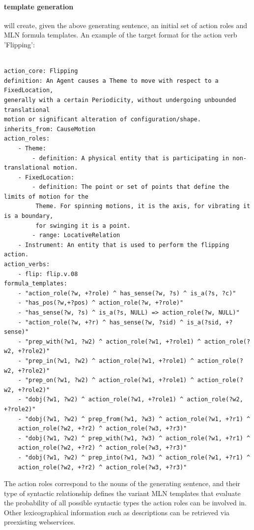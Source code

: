 \documentclass[oribibl]{llncs}
\begin{document}
\paragraph{template generation} will create, given the above generating sentence, an initial set of action roles and MLN formula templates.
An example of the target format for the action verb 'Flipping': 
  
{\scriptsize

\begin{verbatim}
  
action_core: Flipping
definition: An Agent causes a Theme to move with respect to a FixedLocation, 
generally with a certain Periodicity, without undergoing unbounded translational 
motion or significant alteration of configuration/shape.
inherits_from: CauseMotion
action_roles:
    - Theme:
        - definition: A physical entity that is participating in non-translational motion.
    - FixedLocation:
        - definition: The point or set of points that define the limits of motion for the
         Theme. For spinning motions, it is the axis, for vibrating it is a boundary, 
         for swinging it is a point. 
        - range: LocativeRelation
    - Instrument: An entity that is used to perform the flipping action.
action_verbs:
    - flip: flip.v.08
formula_templates:
    - "action_role(?w, +?role) ^ has_sense(?w, ?s) ^ is_a(?s, ?c)"
    - "has_pos(?w,+?pos) ^ action_role(?w, +?role)"
    - "has_sense(?w, ?s) ^ is_a(?s, NULL) => action_role(?w, NULL)"
    - "action_role(?w, +?r) ^ has_sense(?w, ?sid) ^ is_a(?sid, +?sense)"
    - "prep_with(?w1, ?w2) ^ action_role(?w1, +?role1) ^ action_role(?w2, +?role2)"
    - "prep_in(?w1, ?w2) ^ action_role(?w1, +?role1) ^ action_role(?w2, +?role2)"
    - "prep_on(?w1, ?w2) ^ action_role(?w1, +?role1) ^ action_role(?w2, +?role2)"
    - "dobj(?w1, ?w2) ^ action_role(?w1, +?role1) ^ action_role(?w2, +?role2)"
    - "dobj(?w1, ?w2) ^ prep_from(?w1, ?w3) ^ action_role(?w1, +?r1) ^ 
    action_role(?w2, +?r2) ^ action_role(?w3, +?r3)"
    - "dobj(?w1, ?w2) ^ prep_with(?w1, ?w3) ^ action_role(?w1, +?r1) ^ 
    action_role(?w2, +?r2) ^ action_role(?w3, +?r3)"
    - "dobj(?w1, ?w2) ^ prep_into(?w1, ?w3) ^ action_role(?w1, +?r1) ^ 
    action_role(?w2, +?r2) ^ action_role(?w3, +?r3)"
\end{verbatim}
}
The action roles correspond to the nouns of the generating sentence, and their type of syntactic relationship defines the variant MLN templates that evaluate the probability of all possible syntactic types the action roles can be involved in. Other lexicographical information such as descriptions can be retrieved via preexisting webservices.
\end{document}
